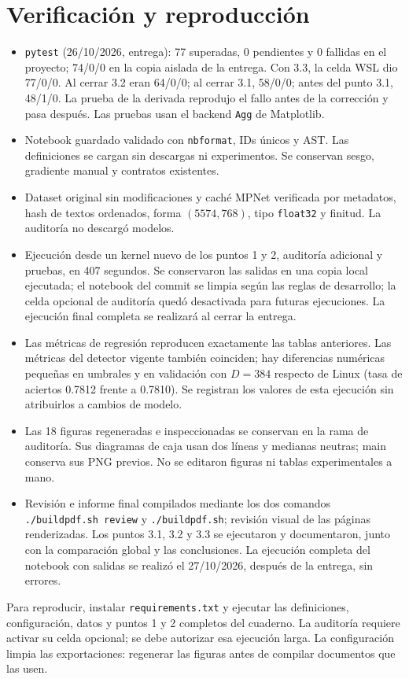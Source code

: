 \documentclass[11pt,letterpaper]{article}
\renewcommand{\_}{\originalunderscore\allowbreak}
\begin{document}
\newpage
\section{Verificación y reproducción}
\begin{itemize}
\item \texttt{pytest} (26/10/2026, entrega): 77 superadas, 0 pendientes y
0 fallidas en el proyecto; 74/0/0 en la copia aislada de la entrega. Con 3.3,
la celda WSL dio 77/0/0.
Al cerrar 3.2 eran 64/0/0; al cerrar 3.1, 58/0/0; antes del punto 3.1, 48/1/0. La
prueba de la derivada reprodujo el fallo antes de la corrección y pasa
después. Las pruebas usan el backend \texttt{Agg} de Matplotlib.
\item Notebook guardado validado con \texttt{nbformat}, IDs únicos y AST.
Las definiciones se cargan sin descargas ni experimentos. Se conservan
sesgo, gradiente manual y contratos existentes.
\item Dataset original sin modificaciones y caché MPNet verificada por
metadatos, hash de textos ordenados, forma $(5574,768)$, tipo
\texttt{float32} y finitud. La auditoría no descargó modelos.
\item Ejecución desde un kernel nuevo de los puntos 1 y 2, auditoría adicional
y pruebas, en 407 segundos. Se conservaron las salidas en una copia local
ejecutada; el notebook del commit se limpia según las reglas de desarrollo;
la celda opcional de auditoría quedó desactivada para futuras ejecuciones.
La ejecución final completa se realizará al cerrar la entrega.
\item Las métricas de regresión reproducen exactamente las tablas anteriores.
Las métricas del detector vigente también coinciden; hay diferencias
numéricas pequeñas en umbrales y en validación con $D=384$ respecto de
Linux (tasa de aciertos 0.7812 frente a 0.7810). Se registran los valores
de esta ejecución sin atribuirlos a cambios de modelo.
\item Las 18 figuras regeneradas e inspeccionadas se conservan en la rama
de auditoría. Sus diagramas de caja usan dos líneas y medianas neutras;
main conserva sus PNG previos. No se editaron figuras ni tablas
experimentales a mano.
\item Revisión e informe final compilados mediante los dos comandos
\texttt{./build\_pdf.sh review} y \texttt{./build\_pdf.sh}; revisión visual
de las páginas renderizadas.
Los puntos 3.1, 3.2 y 3.3 se ejecutaron y documentaron, junto con la
comparación global y las conclusiones. La ejecución completa del notebook
con salidas se realizó el 27/10/2026, después de la entrega, sin errores.
\end{itemize}

Para reproducir, instalar \texttt{requirements.txt} y ejecutar las definiciones,
configuración, datos y puntos 1 y 2 completos del cuaderno. La auditoría
requiere activar su celda opcional; se debe autorizar esa ejecución larga. La configuración limpia
las exportaciones: regenerar las figuras antes de compilar documentos que las usen.
\end{document}
